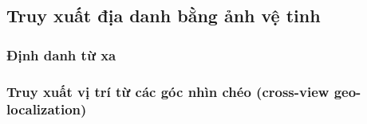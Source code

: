 \subsection{Truy xuất địa danh bằng ảnh vệ tinh}

\subsubsection{Định danh từ xa}

\subsubsection{Truy xuất vị trí từ các góc nhìn chéo (cross-view geo-localization)}

